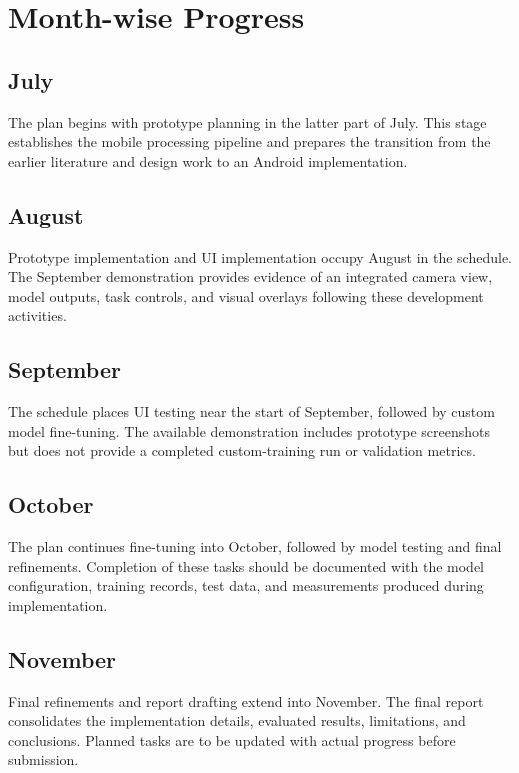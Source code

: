 \label{end:gantt}
\section{Month-wise Progress}\label{sec:progress}

\subsection{July}
The plan begins with prototype planning in the latter part of July. This stage establishes the
mobile processing pipeline and prepares the transition from the earlier literature and design
work to an Android implementation.

\subsection{August}
Prototype implementation and UI implementation occupy August in the schedule. The September
demonstration provides evidence of an integrated camera view, model outputs, task
controls, and visual overlays following these development activities.

\subsection{September}
The schedule places UI testing near the start of September, followed by custom model fine-tuning.
The available demonstration includes prototype screenshots but does not provide a completed
custom-training run or validation metrics.

\subsection{October}
The plan continues fine-tuning into October, followed by model testing and final refinements.
Completion of these tasks should be documented with the model configuration, training records,
test data, and measurements produced during implementation.

\subsection{November}
Final refinements and report drafting extend into November. The final report consolidates the
implementation details, evaluated results, limitations, and conclusions. Planned tasks are
to be updated with actual progress before submission.
\label{end:progress}\label{end:scheduling}
